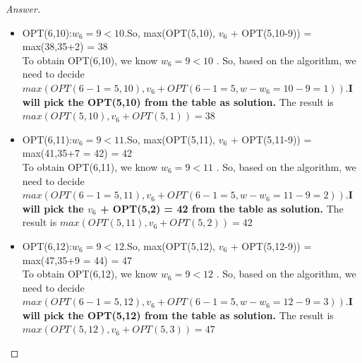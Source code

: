 \documentclass[11pt]{article}
\theoremstyle{definition}
\theoremstyle{definition}
\theoremstyle{definition}
\begin{document}
\begin{proof}[Answer]
\begin{itemize}
\item OPT(6,10):$w_6 =9 < 10.$So, max(OPT(5,10), $v_6$ + OPT(5,10-9)) = max(38,35+2) = 38
\\To obtain OPT(6,10), we know $w_6 = 9<10$ . So, based on the algorithm, we need to decide $max(OPT(6-1=5,10), v_6 + OPT(6-1=5, w-w_6 = 10-9=1))$.\textbf{I will pick the OPT(5,10) from the table as solution.} The result is $max(OPT(5,10), v_6 + OPT(5, 1)) =  38$

\item OPT(6,11):$w_6 =9 < 11.$So, max(OPT(5,11), $v_6$ + OPT(5,11-9)) = max(41,35+7 = 42) = 42
\\ To obtain OPT(6,11), we know $w_6 = 9<11$ . So, based on the algorithm, we need to decide $max(OPT(6-1=5,11), v_6 + OPT(6-1=5, w-w_6 = 11-9=2))$.\textbf{I will pick the $v_6$ + OPT(5,2) = 42 from the table as solution.} The result is $max(OPT(5,11), v_6 + OPT(5, 2)) =  42$

\item OPT(6,12):$w_6 =9 < 12.$So, max(OPT(5,12), $v_6$ + OPT(5,12-9)) = max(47,35+9 = 44) = 47
\\ To obtain OPT(6,12), we know $w_6 = 9<12$ . So, based on the algorithm, we need to decide $max(OPT(6-1=5,12), v_6 + OPT(6-1=5, w-w_6 = 12-9=3))$.\textbf{I will pick the OPT(5,12) from the table as solution.} The result is $max(OPT(5,12), v_6 + OPT(5, 3)) =  47$
\end{itemize}
\end{proof}
\end{document}
